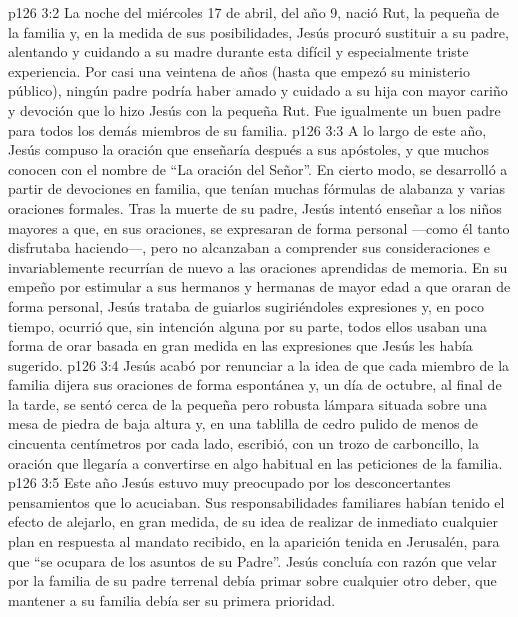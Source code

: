 \vs p126 3:2 La noche del miércoles 17 de abril, del año 9, nació Rut, la pequeña de la familia y, en la medida de sus posibilidades, Jesús procuró sustituir a su padre, alentando y cuidando a su madre durante esta difícil y especialmente triste experiencia. Por casi una veintena de años (hasta que empezó su ministerio público), ningún padre podría haber amado y cuidado a su hija con mayor cariño y devoción que lo hizo Jesús con la pequeña Rut. Fue igualmente un buen padre para todos los demás miembros de su familia.
\vs p126 3:3 \pc A lo largo de este año, Jesús compuso la oración que enseñaría después a sus apóstoles, y que muchos conocen con el nombre de “La oración del Señor”. En cierto modo, se desarrolló a partir de devociones en familia, que tenían muchas fórmulas de alabanza y varias oraciones formales. Tras la muerte de su padre, Jesús intentó enseñar a los niños mayores a que, en sus oraciones, se expresaran de forma personal ---como él tanto disfrutaba haciendo---, pero no alcanzaban a comprender sus consideraciones e invariablemente recurrían de nuevo a las oraciones aprendidas de memoria. En su empeño por estimular a sus hermanos y hermanas de mayor edad a que oraran de forma personal, Jesús trataba de guiarlos sugiriéndoles expresiones y, en poco tiempo, ocurrió que, sin intención alguna por su parte, todos ellos usaban una forma de orar basada en gran medida en las expresiones que Jesús les había sugerido.
\vs p126 3:4 Jesús acabó por renunciar a la idea de que cada miembro de la familia dijera sus oraciones de forma espontánea y, un día de octubre, al final de la tarde, se sentó cerca de la pequeña pero robusta lámpara situada sobre una mesa de piedra de baja altura y, en una tablilla de cedro pulido de menos de cincuenta centímetros por cada lado, escribió, con un trozo de carboncillo, la oración que llegaría a convertirse en algo habitual en las peticiones de la familia.
\vs p126 3:5 \pc Este año Jesús estuvo muy preocupado por los desconcertantes pensamientos que lo acuciaban. Sus responsabilidades familiares habían tenido el efecto de alejarlo, en gran medida, de su idea de realizar de inmediato cualquier plan en respuesta al mandato recibido, en la aparición tenida en Jerusalén, para que “se ocupara de los asuntos de su Padre”. Jesús concluía con razón que velar por la familia de su padre terrenal debía primar sobre cualquier otro deber, que mantener a su familia debía ser su primera prioridad.
